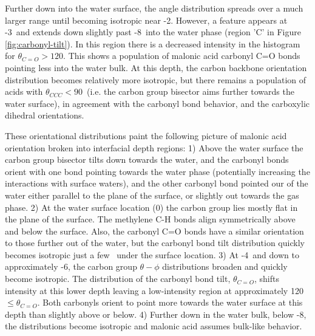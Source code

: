 Further down into the water surface, the angle distribution spreads over a much larger range until becoming isotropic near -2\angs. However, a feature appears at -3\angs~and extends down slightly past -8\angs~into the water phase (region 'C' in Figure \ref{fig:carbonyl-tilt}). In this region there is a decreased intensity in the histogram for $\theta_{C=O} > 120$\textdegree. This shows a population of malonic acid carbonyl C=O bonds pointing less into the water bulk. At this depth, the carbon backbone orientation distribution becomes relatively more isotropic, but there remains a population of acids with $\theta_{CCC} < 90$\textdegree~(i.e. the carbon group bisector aims further towards the water surface), in agreement with the carbonyl bond behavior, and the carboxylic dihedral orientations.

These orientational distributions paint the following picture of malonic acid orientation broken into interfacial depth regions: 1) Above the water surface the carbon group bisector tilts down towards the water, and the carbonyl bonds orient with one bond pointing towards the water phase (potentially increasing the interactions with surface waters), and the other carbonyl bond pointed our of the water either parallel to the plane of the surface, or slightly out towards the gas phase. 2) At the water surface location (0\angs) the carbon group lies mostly flat in the plane of the surface. The methylene C-H bonds align symmetrically above and below the surface. Also, the carbonyl C=O bonds have a similar orientation to those further out of the water, but the carbonyl bond tilt distribution quickly becomes isotropic just a few \angs~under the surface location. 3) At -4\angs~and down to approximately -6\angs, the carbon group $\theta-\phi$ distributions broaden and quickly become isotropic. The distribution of the carbonyl bond tilt, $\theta_{C=O}$, shifts intensity at this lower depth leaving a low-intensity region at approximately 120\textdegree~$\le \theta_{C=O}$. Both carbonyls orient to point more towards the water surface at this depth than slightly above or below. 4) Further down in the water bulk, below -8\angs, the distributions become isotropic and malonic acid assumes bulk-like behavior.
